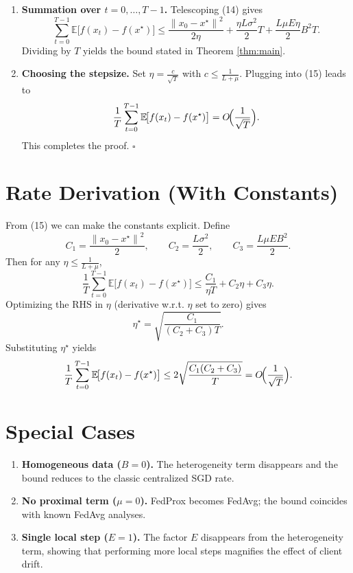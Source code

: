 \documentclass{article}
\newcommand{\E}{\mathbb{E}}
\newcommand{\norm}[1]{\left\lVert #1\right\rVert}
\begin{document}
\begin{enumerate}[label=[Step \arabic*], leftmargin=*]
\item \textbf{Summation over $t=0,\dots,T-1$.}  
    Telescoping (14) gives
    \[
    \sum_{t=0}^{T-1}\E\!\bigl[f(x_t)-f(x^\star)\bigr]
    \le \frac{\norm{x_0-x^\star}^2}{2\eta}
       +\frac{\eta L\sigma^2}{2}T
       +\frac{L\mu E\eta}{2}B^2 T .
    \tag{15}
    \]
    Dividing by $T$ yields the bound stated in Theorem \ref{thm:main}.

\item \textbf{Choosing the stepsize.}  
    Set $\eta = \frac{c}{\sqrt{T}}$ with $c\le \frac{1}{L+\mu}$. Plugging into (15) leads to
    \[
    \frac{1}{T}\sum_{t=0}^{T-1}\E\!\bigl[f(x_t)-f(x^\star)\bigr]
    = O\!\Bigl(\frac{1}{\sqrt{T}}\Bigr) .
    \]
    This completes the proof. $\square$
\end{enumerate}

\section*{Rate Derivation (With Constants)}
From (15) we can make the constants explicit. Define
\[
C_1=\frac{\norm{x_0-x^\star}^2}{2},\qquad
C_2=\frac{L\sigma^2}{2},\qquad
C_3=\frac{L\mu E B^2}{2}.
\]
Then for any $\eta\le\frac{1}{L+\mu}$,
\[
\frac{1}{T}\sum_{t=0}^{T-1}\E\!\bigl[f(x_t)-f(x^\star)\bigr]
\le \frac{C_1}{\eta T}+C_2\eta + C_3\eta .
\]
Optimizing the RHS in $\eta$ (derivative w.r.t. $\eta$ set to zero) gives
\[
\eta^\star = \sqrt{\frac{C_1}{(C_2+C_3)T}} .
\]
Substituting $\eta^\star$ yields
\[
\frac{1}{T}\sum_{t=0}^{T-1}\E\!\bigl[f(x_t)-f(x^\star)\bigr]
\le 2\sqrt{\frac{C_1(C_2+C_3)}{T}}
= O\!\Bigl(\frac{1}{\sqrt{T}}\Bigr).
\]

\section*{Special Cases}
\begin{enumerate}[label=\alph*)]
\item \textbf{Homogeneous data ($B=0$).} The heterogeneity term disappears and the bound reduces to the classic centralized SGD rate.
\item \textbf{No proximal term ($\mu=0$).} FedProx becomes FedAvg; the bound coincides with known FedAvg analyses.
\item \textbf{Single local step ($E=1$).} The factor $E$ disappears from the heterogeneity term, showing that performing more local steps magnifies the effect of client drift.
\end{enumerate}
\end{document}
